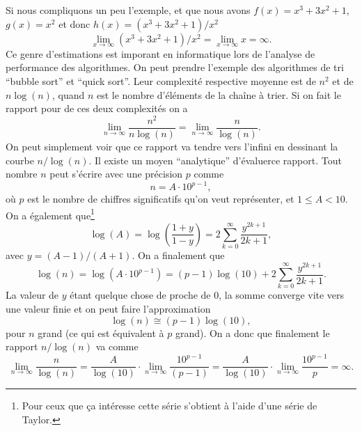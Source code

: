 \documentclass[a4paper,12pt]{book}
\begin{document}
Si nous compliquons un peu l'exemple, et que nous avons $f(x)=x^3+3x^2+1$, $g(x)=x^2$ et donc $h(x)=(x^3+3x^2+1)/x^2$
\begin{equation}
 \lim_{x\rightarrow\infty} (x^3+3x^2+1)/x^2=\lim_{x\rightarrow\infty} x=\infty.
\end{equation}
Ce genre d'estimations est imporant en informatique lors de l'analyse de performance des algorithmes.
On peut prendre l'exemple des algorithmes de tri ``bubble sort'' et ``quick sort''. Leur complexité 
respective moyenne est de $n^2$ et de $n\log(n)$, quand $n$ est le nombre d'éléments de la chaîne à trier.
Si on fait le rapport pour de ces deux complexités on a 
\begin{equation}
 \lim_{n\rightarrow\infty} \frac{n^2}{n\log(n)}=\lim_{n\rightarrow\infty} \frac{n}{\log(n)}.
\end{equation}
On peut simplement voir que ce rapport va tendre vers l'infini en dessinant la courbe $n/\log(n)$. 
Il existe un moyen ``analytique'' d'évaluerce rapport. Tout nombre $n$ peut s'écrire avec une précision $p$ comme
\begin{equation}
 n=A\cdot 10^{p-1},
\end{equation}
où $p$ est le nombre de chiffres significatifs qu'on veut représenter, et $1\leq A< 10$. On a également que\footnote{Pour ceux que ça intéresse 
cette série s'obtient à l'aide d'une série de Taylor.}
\begin{equation}
 \log(A)=\log\left(\frac{1+y}{1-y}\right)=2\sum_{k=0}^\infty \frac{y^{2k+1}}{2k+1},
\end{equation}
avec $y=(A-1)/(A+1)$. On a finalement que
\begin{equation}
 \log(n)=\log(A\cdot 10^{p-1})=(p-1)\log(10)+2\sum_{k=0}^\infty \frac{y^{2k+1}}{2k+1}.
\end{equation}
La valeur de $y$ étant quelque chose de proche de 0, la somme converge vite vers une valeur finie et on peut faire l'approximation
\begin{equation}
 \log(n)\cong(p-1)\log(10),
\end{equation}
pour $n$ grand (ce qui est équivalent à $p$ grand).
On a donc que finalement le rapport $n/\log(n)$ va comme
\begin{equation}
 \lim_{n\rightarrow\infty}\frac{n}{\log(n)}=\frac{A}{\log(10)}\cdot\lim_{n\rightarrow\infty}\frac{10^{p-1}}{(p-1)}=\frac{A}{\log(10)}\cdot\lim_{n\rightarrow\infty}\frac{10^{p-1}}{p}=\infty.
\end{equation}
\end{document}
